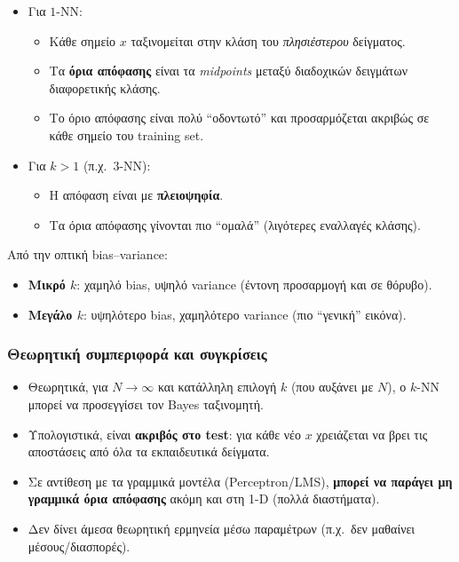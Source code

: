 \documentclass[a4paper,11pt]{article}
\begin{document}
\begin{itemize}
  \item Για $1$-NN:
        \begin{itemize}
          \item Κάθε σημείο $x$ ταξινομείται στην κλάση του \emph{πλησιέστερου} δείγματος.
          \item Τα \textbf{όρια απόφασης} είναι τα \emph{midpoints} μεταξύ
                διαδοχικών δειγμάτων διαφορετικής κλάσης.
          \item Το όριο απόφασης είναι πολύ ``οδοντωτό'' και προσαρμόζεται ακριβώς
                σε κάθε σημείο του training set.
        \end{itemize}
  \item Για $k>1$ (π.χ.\ $3$-NN):
        \begin{itemize}
          \item Η απόφαση είναι με \textbf{πλειοψηφία}.
          \item Τα όρια απόφασης γίνονται πιο ``ομαλά'' (λιγότερες εναλλαγές κλάσης).
        \end{itemize}
\end{itemize}

Από την οπτική bias–variance:
\begin{itemize}
  \item \textbf{Μικρό $k$}: χαμηλό bias, υψηλό variance (έντονη προσαρμογή και σε θόρυβο).
  \item \textbf{Μεγάλο $k$}: υψηλότερο bias, χαμηλότερο variance (πιο ``γενική'' εικόνα).
\end{itemize}

\subsubsection*{Θεωρητική συμπεριφορά και συγκρίσεις}

\begin{itemize}
  \item Θεωρητικά, για $N\to\infty$ και κατάλληλη επιλογή $k$ (που αυξάνει με $N$),
        ο $k$-NN μπορεί να προσεγγίσει τον Bayes ταξινομητή.
  \item Υπολογιστικά, είναι \textbf{ακριβός στο test}: για κάθε νέο $x$
        χρειάζεται να βρει τις αποστάσεις από όλα τα εκπαιδευτικά δείγματα.
  \item Σε αντίθεση με τα γραμμικά μοντέλα (Perceptron/LMS),
        \textbf{μπορεί να παράγει μη γραμμικά όρια απόφασης} ακόμη και στη 1-D
        (πολλά διαστήματα).
  \item Δεν δίνει άμεσα θεωρητική ερμηνεία μέσω παραμέτρων (π.χ.\ δεν μαθαίνει μέσους/διασπορές).
\end{itemize}
\end{document}
